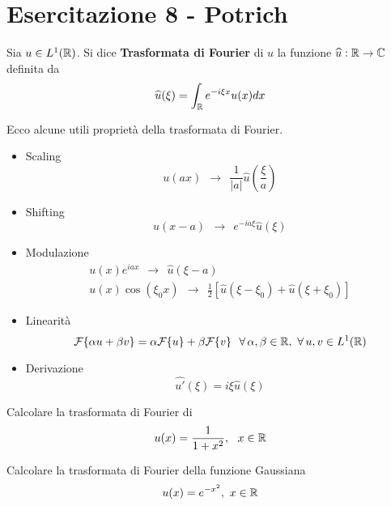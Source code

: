 \chapter{Esercitazione 8 - Potrich}
\ParteEsercizi
\begin{defn}
Sia $u\in L^{1}(\mathbb{R})$. Si dice \textbf{Trasformata di Fourier} di $u$ la funzione $\widehat{u} :\mathbb{R} \rightarrow \mathbb{C} $ definita da
\begin{equation*}
\widehat{u}(\xi) = \int _{\mathbb{R} } e^{ - i\xi x} u(x) dx
\end{equation*}
\end{defn}
\begin{thm}
[Proprietà] Ecco alcune utili proprietà della trasformata di Fourier.
\begin{itemize}
\item Scaling
\begin{equation*}
u(ax) \ \ \rightarrow \ \ \frac{1}{| a| }\hat{u}\left(\frac{\xi }{a}\right)
\end{equation*}
\item Shifting
\begin{equation*}
u(x - a) \ \ \rightarrow \ \ e^{ - ia\xi }\hat{u}(\xi)
\end{equation*}
\item Modulazione
\begin{gather*}
u(x) e^{iax} \ \ \rightarrow \ \ \hat{u}(\xi - a)\\
u(x)\cos(\xi _{0} x) \ \ \rightarrow \ \ \frac{1}{2}[\hat{u}(\xi - \xi _{0}) + \hat{u}(\xi + \xi _{0})]
\end{gather*}
\item Linearità
\begin{equation*}
\Fc \{\alpha u + \beta v\} = \alpha \Fc \{u\} + \beta \Fc \{v\} \ \ \forall \alpha ,\beta \in \RR  ,\ \forall u,v\in L^{1}(\RR)
\end{equation*}
\item Derivazione
\begin{equation*}
\widehat{u'}(\xi) = i\xi \hat{u}(\xi)
\end{equation*}
\end{itemize}
\end{thm}

Calcolare la trasformata di Fourier di
\begin{equation*}
u(x) = \frac{1}{1 + x^{2}} ,\ \ x\in \mathbb{R} 
\end{equation*}

Calcolare la trasformata di Fourier della funzione Gaussiana
\begin{equation*}
u(x) = e^{ - x^{2}} ,\ x\in \mathbb{R} 
\end{equation*}
\Esercizio{}

